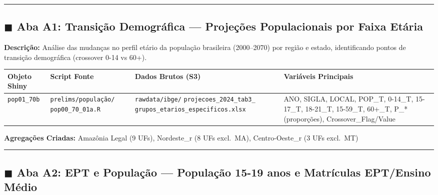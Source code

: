 \documentclass[10pt]{article}
\begin{document}
	\vspace{1em}
	\hrule
	\vspace{0.8em}
	
	\subsection*{\textcolor{tabA}{$\blacksquare$} Aba A1: Transição Demográfica --- Projeções Populacionais por Faixa Etária}
	
	\noindent\textbf{Descrição:} Análise das mudanças no perfil etário da população brasileira (2000--2070) por região e estado, identificando pontos de transição demográfica (crossover 0-14 vs 60+).
	
	\begin{center}
		\small
		\begin{tabular}{p{3.5cm}p{4.5cm}p{5cm}p{9cm}}
			\toprule
			\textbf{Objeto Shiny} & \textbf{Script Fonte} & \textbf{Dados Brutos (S3)} & \textbf{Variáveis Principais} \\
			\midrule
			\texttt{pop01\_70b} & \texttt{prelims/população/} \newline \texttt{pop00\_70\_01a.R} & \texttt{rawdata/ibge/} \newline \texttt{projecoes\_2024\_tab3\_} \newline \texttt{grupos\_etarios\_especificos.xlsx} & ANO, SIGLA, LOCAL, POP\_T, 0-14\_T, 15-17\_T, 18-21\_T, 15-59\_T, 60+\_T, P\_* (proporções), Crossover\_Flag/Value \\
			\bottomrule
		\end{tabular}
	\end{center}
	
	\noindent\textbf{Agregações Criadas:} Amazônia Legal (9 UFs), Nordeste\_r (8 UFs excl.\ MA), Centro-Oeste\_r (3 UFs excl.\ MT)
	
	\vspace{0.8em}
	\hrule
	\vspace{0.8em}
	
	\subsection*{\textcolor{tabA}{$\blacksquare$} Aba A2: EPT e População --- População 15-19 anos e Matrículas EPT/Ensino Médio}
	
\end{document}
